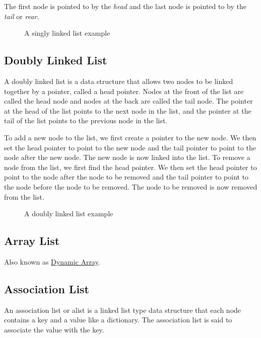 \documentclass{book}
\begin{document}
\noindent The first node is pointed to by the \textit{head} and the last node is pointed to by the \textit{tail} or \textit{rear}.

\begin{figure}[htbp]
    \centering
    
    \caption{A singly linked list example}
    \label{fig:singly_linked_list}
\end{figure}

\subsection{Doubly Linked List}

A doubly linked list is a data structure that allows two nodes to be linked together by a pointer, called a head pointer. Nodes at the front of the list are called the head node and nodes at the back are called the tail node. The pointer at the head of the list points to the next node in the list, and the pointer at the tail of the list points to the previous node in the list.

\noindent To add a new node to the list, we first create a pointer to the new node. We then set the head pointer to point to the new node and the tail pointer to point to the node after the new node. The new node is now linked into the list. To remove a node from the list, we first find the head pointer. We then set the head pointer to point to the node after the node to be removed and the tail pointer to point to the node before the node to be removed. The node to be removed is now removed from the list.

\begin{figure}[htbp]
    \centering
    
    \caption{A doubly linked list example}
    \label{fig:doubly_linked_list}
\end{figure}

\subsection{Array List}

Also known as \hyperlink{subsection.2.1.9}{Dynamic Array}.

\subsection{Association List}

    An association list or alist is a linked list type data structure that each node contains a key and a value like a dictionary. The association list is said to associate the value with the key.
\end{document}
